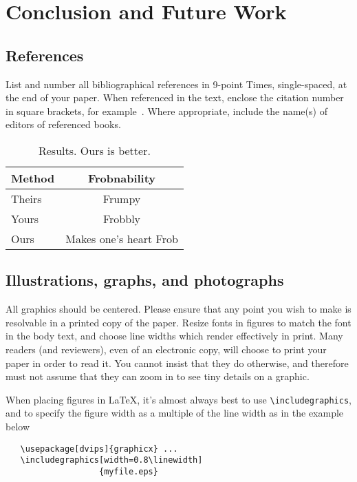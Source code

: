 \documentclass[10pt,twocolumn,letterpaper]{article}
\begin{document}
\section{Conclusion and Future Work}



\subsection{References}

List and number all bibliographical references in 9-point Times,
single-spaced, at the end of your paper. When referenced in the text,
enclose the citation number in square brackets, for
example~\cite{Authors14}.  Where appropriate, include the name(s) of
editors of referenced books.

\begin{table}
\begin{center}
\begin{tabular}{|l|c|}
\hline
Method & Frobnability \\
\hline\hline
Theirs & Frumpy \\
Yours & Frobbly \\
Ours & Makes one's heart Frob\\
\hline
\end{tabular}
\end{center}
\caption{Results.   Ours is better.}
\end{table}

\subsection{Illustrations, graphs, and photographs}

All graphics should be centered.  Please ensure that any point you wish to
make is resolvable in a printed copy of the paper.  Resize fonts in figures
to match the font in the body text, and choose line widths which render
effectively in print.  Many readers (and reviewers), even of an electronic
copy, will choose to print your paper in order to read it.  You cannot
insist that they do otherwise, and therefore must not assume that they can
zoom in to see tiny details on a graphic.

When placing figures in \LaTeX, it's almost always best to use
\verb+\includegraphics+, and to specify the  figure width as a multiple of
the line width as in the example below
{\small\begin{verbatim}
   \usepackage[dvips]{graphicx} ...
   \includegraphics[width=0.8\linewidth]
                   {myfile.eps}
\end{verbatim}
}
\end{document}
